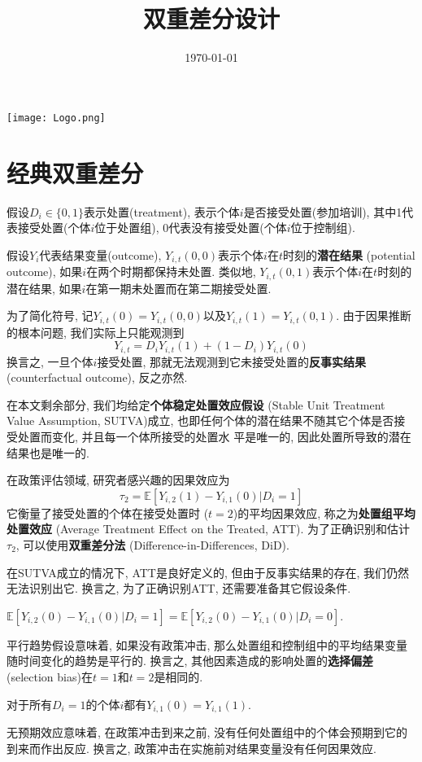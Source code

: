 \documentclass[cn,sakura,14pt,screen,bibstyle=gb7714-2015,math=mtpro2]{elegantnote}
\title{双重差分设计}
\date{\today}
\newcommand{\E}{\mathbb{E}}
\begin{document}
\maketitle

\centerline{
  \texttt{[image: Logo.png]}
}



\section{经典双重差分}

假设$D_i\in \{0,1\}$表示处置(treatment), 表示个体$i$是否接受处置(参加培训), 其中1代表接受处置(个体$i$位于处置组), 0代表没有接受处置(个体$i$位于控制组).


假设$Y_i$代表结果变量(outcome), $Y_{i,t}(0,0)$表示个体$i$在$t$时刻的\textbf{潜在结果} (potential outcome), 如果$i$在两个时期都保持未处置. 类似地, $Y_{i,t}(0,1)$表示个体$i$在$t$时刻的潜在结果, 如果$i$在第一期未处置而在第二期接受处置.

为了简化符号, 记$Y_{i,t}(0)=Y_{i,t}(0,0)$以及$Y_{i,t}(1)=Y_{i,t}(0,1)$. 由于因果推断的根本问题, 我们实际上只能观测到
$$Y_{i,t}=D_iY_{i,t}(1)+(1-D_i)Y_{i,t}(0)$$
换言之, 一旦个体$i$接受处置, 那就无法观测到它未接受处置的\textbf{反事实结果} (counterfactual outcome), 反之亦然.

在本文剩余部分, 我们均给定\textbf{个体稳定处置效应假设} (Stable Unit Treatment Value Assumption, SUTVA)成立, 也即任何个体的潜在结果不随其它个体是否接受处置而变化, 并且每一个体所接受的处置水 平是唯一的, 因此处置所导致的潜在结果也是唯一的.

在政策评估领域, 研究者感兴趣的因果效应为
$$\tau_2=\E[Y_{i,2}(1)-Y_{i,1}(0)|D_i=1]$$
它衡量了接受处置的个体在接受处置时 ($t=2$)的平均因果效应, 称之为\textbf{处置组平均处置效应} (Average Treatment Effect on the Treated, ATT). 为了正确识别和估计$\tau_2$, 可以使用\textbf{双重差分法} (Difference-in-Differences, DiD).

在SUTVA成立的情况下, ATT是良好定义的, 但由于反事实结果的存在, 我们仍然无法识别出它. 换言之, 为了正确识别ATT, 还需要准备其它假设条件.

\begin{definition}[平行趋势]
  $\E[Y_{i,2}(0)-Y_{i,1}(0)|D_i=1]=\E[Y_{i,2}(0)-Y_{i,1}(0)|D_i=0]$.
\end{definition}
平行趋势假设意味着, 如果没有政策冲击, 那么处置组和控制组中的平均结果变量随时间变化的趋势是平行的. 换言之, 其他因素造成的影响处置的\textbf{选择偏差} (selection bias)在$t=1$和$t=2$是相同的.

\begin{definition}[无预期效应]
对于所有$D_i=1$的个体$i$都有$Y_{i,1}(0)=Y_{i,1}(1)$.
\end{definition}
无预期效应意味着, 在政策冲击到来之前, 没有任何处置组中的个体会预期到它的到来而作出反应. 换言之, 政策冲击在实施前对结果变量没有任何因果效应.
\end{document}
